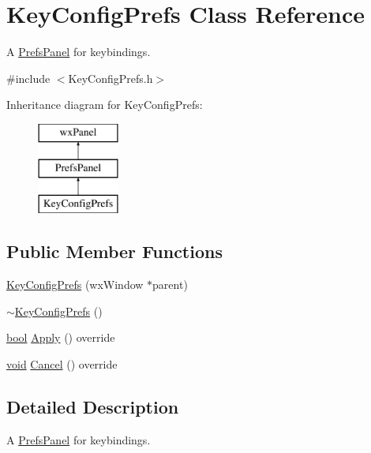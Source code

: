 \hypertarget{class_key_config_prefs}{}\section{Key\+Config\+Prefs Class Reference}
\label{class_key_config_prefs}


A \hyperlink{class_prefs_panel}{Prefs\+Panel} for keybindings.  




{\ttfamily \#include $<$Key\+Config\+Prefs.\+h$>$}

Inheritance diagram for Key\+Config\+Prefs\+:\begin{figure}[H]
\begin{center}
\leavevmode
\includegraphics[height=3.000000cm]{class_key_config_prefs}
\end{center}
\end{figure}
\subsection*{Public Member Functions}
\begin{DoxyCompactItemize}
\item 
\hyperlink{class_key_config_prefs_ab2f6c1157955747240a18f596abca8e4}{Key\+Config\+Prefs} (wx\+Window $\ast$parent)
\item 
\hyperlink{class_key_config_prefs_ae53023d8eb756f8e5790cffe6c189f49}{$\sim$\+Key\+Config\+Prefs} ()
\item 
\hyperlink{mac_2config_2i386_2lib-src_2libsoxr_2soxr-config_8h_abb452686968e48b67397da5f97445f5b}{bool} \hyperlink{class_key_config_prefs_adbe51b4e6c82a0092104e3505754219d}{Apply} () override
\item 
\hyperlink{sound_8c_ae35f5844602719cf66324f4de2a658b3}{void} \hyperlink{class_key_config_prefs_a965c859987daf4640f4fe8a4f7a75c3c}{Cancel} () override
\end{DoxyCompactItemize}


\subsection{Detailed Description}
A \hyperlink{class_prefs_panel}{Prefs\+Panel} for keybindings. 

